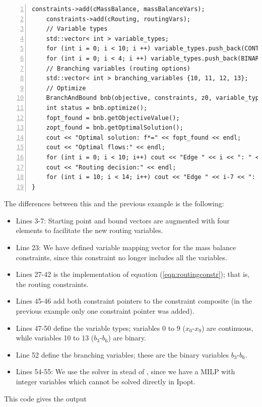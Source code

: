 \begin{lstlisting}[numbers=left]
    constraints->add(cMassBalance, massBalanceVars);
    constraints->add(cRouting, routingVars);
    // Variable types
    std::vector< int > variable_types;
    for (int i = 0; i < 10; i ++) variable_types.push_back(CONTINUOUS);
    for (int i = 0; i < 4; i ++) variable_types.push_back(BINARY);
    // Branching variables (routing options)
    std::vector< int > branching_variables {10, 11, 12, 13};
    // Optimize
    BranchAndBound bnb(objective, constraints, z0, variable_types, branching_variables);
    int status = bnb.optimize();
    fopt_found = bnb.getObjectiveValue();
    zopt_found = bnb.getOptimalSolution();
    cout << "Optimal solution: f*=" << fopt_found << endl;
    cout << "Optimal flows:" << endl;
    for (int i = 0; i < 10; i++) cout << "Edge " << i << ": " << zopt_found.at(i) << endl;
    cout << "Routing decision:" << endl;
    for (int i = 10; i < 14; i++) cout << "Edge " << i-7 << ": " << zopt_found.at(i) << endl;
}
\end{lstlisting}
The differences between this and the previous example is the following:
\begin{itemize}
\item
Lines 3-7: Starting point and bound vectors are augmented with four elements to facilitate the new routing variables.
\item
Line 23: We have defined variable mapping vector for the mass balance constraints, since this constraint no longer includes all the variables.
\item
Lines 27-42 is the implementation of equation (\ref{eqn:routingconstr}); that is, the routing constraints.
\item
Lines 45-46 add both constraint pointers to the constraint composite (in the previous example only one constraint pointer was added).
\item
Lines 47-50 define the variable types; variables 0 to 9 ($x_0$-$x_9$) are continuous, while variables 10 to 13 ($b_3$-$b_6$) are binary.
\item
Line 52 define the branching variables; these are the binary variables $b_3$-$b_6$.
\item
Lines 54-55: We use the  solver in stead of , since we have a MILP with integer variables which cannot be solved directly in Ipopt.
\end{itemize}
This code gives the output
\newline
